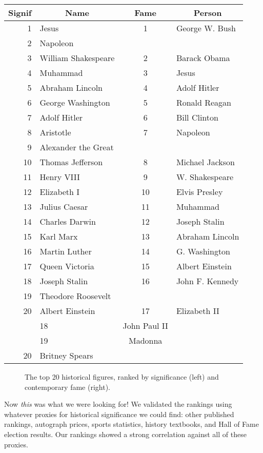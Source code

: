 \documentclass[10pt]{article}
\begin{document}
\begin{center}
\begin{tabular}{|r|l|c|l|}
\hline
Signif & \multicolumn{1}{|c|}{Name} & \multicolumn{1}{|c|}{Fame} & \multicolumn{1}{|c|}{Person} \\
\hline
1 & Jesus & 1 & George W. Bush \\
2 & Napoleon &  &  \\
3 & William Shakespeare & 2 & Barack Obama \\
4 & Muhammad & 3 & Jesus \\
5 & Abraham Lincoln & 4 & Adolf Hitler \\
6 & George Washington & 5 & Ronald Reagan \\
7 & Adolf Hitler & 6 & Bill Clinton \\
8 & Aristotle & 7 & Napoleon \\
9 & Alexander the Great &  &  \\
10 & Thomas Jefferson & 8 & Michael Jackson \\
11 & Henry VIII & 9 & W. Shakespeare \\
12 & Elizabeth I & 10 & Elvis Presley \\
13 & Julius Caesar & 11 & Muhammad \\
14 & Charles Darwin & 12 & Joseph Stalin \\
15 & Karl Marx & 13 & Abraham Lincoln \\
16 & Martin Luther & 14 & G. Washington \\
17 & Queen Victoria & 15 & Albert Einstein \\
18 & Joseph Stalin & 16 & John F. Kennedy \\
19 & Theodore Roosevelt &  &  \\
20 & Albert Einstein & 17 & Elizabeth II \\
 & 18 & John Paul II &  \\
 & 19 & Madonna &  \\
20 & Britney Spears &  &  \\
\hline
\end{tabular}
\end{center}

\begin{figure}[h]
\centering
\caption{The top 20 historical figures, ranked by significance (left) and contemporary fame (right).}
\end{figure}

Now \emph{this} was what we were looking for! We validated the rankings using whatever proxies for historical significance we could find: other published rankings, autograph prices, sports statistics, history textbooks, and Hall of Fame election results. Our rankings showed a strong correlation against all of these proxies.
\end{document}
